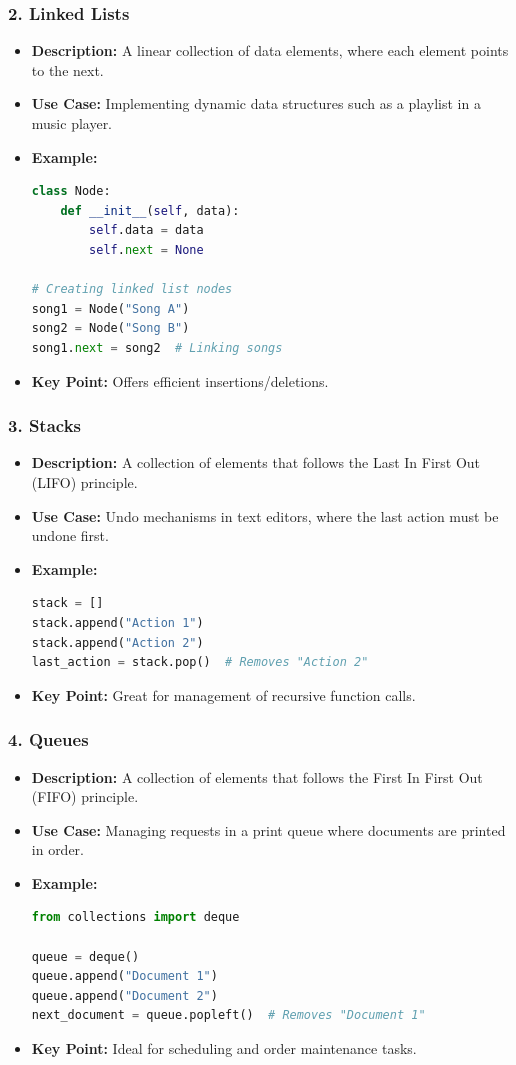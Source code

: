 \documentclass{beamer}
\begin{document}
\begin{frame}[fragile]
    \frametitle{2. Linked Lists}
    \begin{itemize}
        \item \textbf{Description:} A linear collection of data elements, where each element points to the next.
        \item \textbf{Use Case:} Implementing dynamic data structures such as a playlist in a music player.
        \item \textbf{Example:}
        \begin{lstlisting}[language=Python]
class Node:
    def __init__(self, data):
        self.data = data
        self.next = None

# Creating linked list nodes
song1 = Node("Song A")
song2 = Node("Song B")
song1.next = song2  # Linking songs
        \end{lstlisting}
        \item \textbf{Key Point:} Offers efficient insertions/deletions.
    \end{itemize}
\end{frame}

\begin{frame}[fragile]
    \frametitle{3. Stacks}
    \begin{itemize}
        \item \textbf{Description:} A collection of elements that follows the Last In First Out (LIFO) principle.
        \item \textbf{Use Case:} Undo mechanisms in text editors, where the last action must be undone first.
        \item \textbf{Example:}
        \begin{lstlisting}[language=Python]
stack = []
stack.append("Action 1")
stack.append("Action 2")
last_action = stack.pop()  # Removes "Action 2"
        \end{lstlisting}
        \item \textbf{Key Point:} Great for management of recursive function calls.
    \end{itemize}
\end{frame}

\begin{frame}[fragile]
    \frametitle{4. Queues}
    \begin{itemize}
        \item \textbf{Description:} A collection of elements that follows the First In First Out (FIFO) principle.
        \item \textbf{Use Case:} Managing requests in a print queue where documents are printed in order.
        \item \textbf{Example:}
        \begin{lstlisting}[language=Python]
from collections import deque

queue = deque()
queue.append("Document 1")
queue.append("Document 2")
next_document = queue.popleft()  # Removes "Document 1"
        \end{lstlisting}
        \item \textbf{Key Point:} Ideal for scheduling and order maintenance tasks.
    \end{itemize}
\end{frame}
\end{document}
